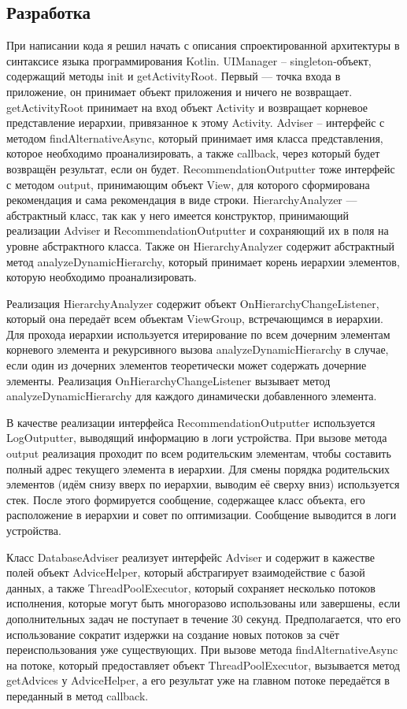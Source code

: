 \documentclass[a4paper,14pt]{extarticle} %
\begin{document}
	\subsection{Разработка}
	
	При написании кода я решил начать с описания спроектированной архитектуры в синтаксисе языка программирования Kotlin. UIManager – singleton-объект, содержащий методы init и getActivityRoot. Первый —  точка входа в приложение, он принимает объект приложения и ничего не возвращает. getActivityRoot принимает на вход объект Activity и возвращает корневое представление иерархии, привязанное к этому Activity. Adviser – интерфейс с методом findAlternativeAsync, который принимает имя класса представления, которое необходимо проанализировать, а также callback, через который будет возвращён результат, если он будет. RecommendationOutputter тоже интерфейс с методом output, принимающим объект View, для которого сформирована рекомендация и сама рекомендация в виде строки. HierarchyAnalyzer —  абстрактный класс, так как у него имеется конструктор, принимающий реализации Adviser и RecommendationOutputter и сохраняющий их в поля на уровне абстрактного класса. Также он HierarchyAnalyzer содержит абстрактный метод analyzeDynamicHierarchy, который принимает корень иерархии элементов, которую необходимо проанализировать.
	
	Реализация HierarchyAnalyzer содержит объект OnHierarchyChangeListener, который она передаёт всем объектам ViewGroup, встречающимся в иерархии. Для прохода иерархии используется итерирование по всем дочерним элементам корневого элемента и рекурсивного вызова analyzeDynamicHierarchy в случае, если один из дочерних элементов теоретически может содержать дочерние элементы. Реализация OnHierarchyChangeListener вызывает метод analyzeDynamicHierarchy для каждого динамически добавленного элемента.
	
	В качестве реализации интерфейса RecommendationOutputter используется LogOutputter, выводящий информацию в логи устройства. При вызове метода output реализация проходит по всем родительским элементам, чтобы составить полный адрес текущего элемента в иерархии. Для смены порядка родительских элементов (идём снизу вверх по иерархии, выводим её сверху вниз) используется стек. После этого формируется сообщение, содержащее класс объекта, его расположение в иерархии и совет по оптимизации. Сообщение выводится в логи устройства.
	
	Класс DatabaseAdviser реализует интерфейс Adviser и содержит в кажестве полей объект AdviceHelper, который абстрагирует взаимодействие с базой данных, а также ThreadPoolExecutor, который сохраняет несколько потоков исполнения, которые могут быть многоразово использованы или завершены, если дополнительных задач не поступает в течение 30 секунд. Предполагается, что его использование сократит издержки на создание новых потоков за счёт переиспользования уже существующих. При вызове метода findAlternativeAsync на потоке, который предоставляет объект ThreadPoolExecutor, вызывается метод getAdvices у AdviceHelper, а его результат уже на главном потоке передаётся в переданный в метод callback.
	
\end{document}
